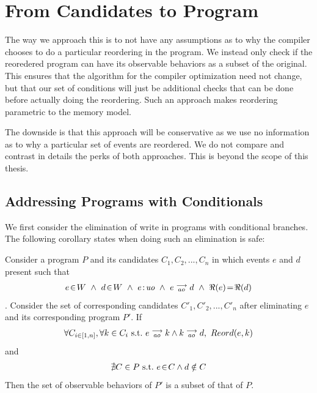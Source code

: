 \section{From Candidates to Program}

    The way we approach this is to not have any assumptions as to why the compiler chooses to do a particular reordering in the program. 
    We instead only check if the reoredered program can have its observable behaviors as a subset of the original. 
    This ensures that the algorithm for the compiler optimization need not change, but that our set of conditions will just be additional checks that can be done before actually doing the reordering. 
    Such an approach makes reordering parametric to the memory model. 
    
    The downside is that this approach will be conservative as we use no information as to why a particular set of events are reordered. We do not compare and contrast in details the perks of both approaches. This is beyond the scope of this thesis.

    \subsection{Addressing Programs with Conditionals}
        We first consider the elimination of write in programs with conditional branches. The following corollary states when doing such an elimination is safe: 

        \begin{corollary}
            Consider a program $P$ and its candidates $C_1, C_2, ... , C_n$ in which events $e$ and $d$ present such that 
            \begin{align*}
                \event{e}{W} \ \wedge \ \event{d}{W} \ \wedge \ \et{e}{uo} \ \wedge \ \reln{e}{ao}{d} \ \wedge \ \Re(e)\!=\!\Re(d)
            \end{align*} . 
            Consider the set of corresponding candidates $C'_1, C'_2, ... , C'_n$ after eliminating $e$ and its corresponding program $P'$. If
            \begin{align*}
                \forall C_{i \in [1,n]}, \forall k \in C_i \ \text{s.t.} \ e\stackrel{\longrightarrow}{_{ao}}k \wedge k\stackrel{\longrightarrow}{_{ao}}d, \    
                Reord(e,k)  
            \end{align*}
            and
            \begin{align*}
                \nexists C \in P \ \text{s.t.} \ e\!\in\!C \wedge d \notin C
            \end{align*}
            Then the set of observable behaviors of $P'$ is a subset of that of $P$.
        \end{corollary}

